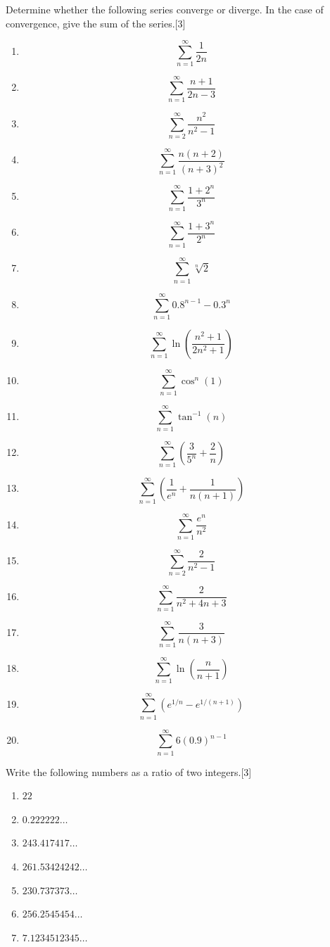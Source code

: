 \begin{multicolblock}{Determine whether the 
following series converge or diverge. 
In the case of convergence, give the sum of the series.}[3]
\begin{enumerate}
  \item \[\sum_{n=1}^{\infty} \frac{1}{2 n}\]
  \item \[\sum_{n=1}^{\infty} \frac{n+1}{2 n-3}\]
  \item \[\sum_{n=2}^{\infty} \frac{n^{2}}{n^{2}-1}\]
  \item \[\sum_{n=1}^{\infty} \frac{n(n+2)}{(n+3)^{2}}\]
  \item \[\sum_{n=1}^{\infty} \frac{1+2^{n}}{3^{n}}\]
  \item \[\sum_{n=1}^{\infty} \frac{1+3^{n}}{2^{n}}\]
  \item \[\sum_{n=1}^{\infty} \sqrt[n]{2}\]
  \item \[\sum_{n=1}^{\infty} 0.8^{n-1}-0.3^{n}\]
  \item \[\sum_{n=1}^{\infty} \ln \left(\frac{n^{2}+1}{2 n^{2}+1}\right)\]
  \item \[\sum_{n=1}^{\infty} \cos ^{n}(1)\]
  \item \[\sum_{n=1}^{\infty} \tan ^{-1}(n)\]
  \item \[\sum_{n=1}^{\infty}\left(\frac{3}{5^{n}}+\frac{2}{n}\right)\]
  \item \[\sum_{n=1}^{\infty}\left(\frac{1}{e^{n}}+\frac{1}{n(n+1)}\right)\]
  \item \[\sum_{n=1}^{\infty} \frac{e^{n}}{n^{2}}\]
  \item \[\sum_{n=2}^{\infty} \frac{2}{n^{2}-1}\]
  \item \[\sum_{n=1}^{\infty} \frac{2}{n^{2}+4 n+3}\]
  \item \[\sum_{n=1}^{\infty} \frac{3}{n(n+3)}\]
  \item \[\sum_{n=1}^{\infty} \ln \left(\frac{n}{n+1}\right)\]
  \item \[\sum_{n=1}^{\infty}\left(e^{1 / n}-e^{1 /(n+1)}\right)\]
  \item \[\sum_{n=1}^{\infty} 6(0.9)^{n-1}\]
\end{enumerate}
\end{multicolblock}
\newpage
\begin{multicolblock}{Write the following numbers as a ratio of two integers.}[3]
\begin{enumerate}
  \item $22$
  \item $0.222222 \ldots$
  \item $243.417417 \ldots$
  \item $261.53424242 \ldots$
  \item $230.737373 \ldots$
  \item $256.2545454 \ldots$
  \item $7.1234512345 \ldots$
\end{enumerate}
\end{multicolblock}